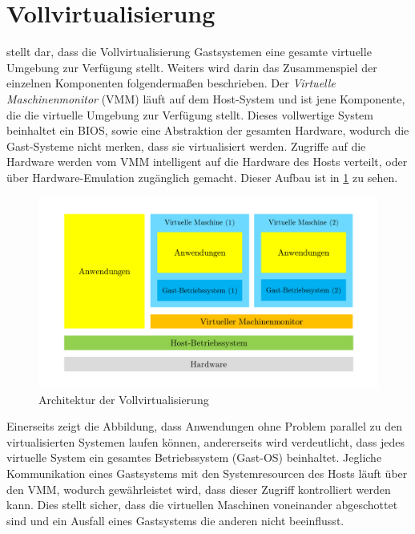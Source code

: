\section{Vollvirtualisierung}
\label{sec:vollvirtualisierung}
\autocite{Baun2009} stellt dar, dass die Vollvirtualisierung Gastsystemen eine gesamte virtuelle Umgebung zur Verfügung stellt.
Weiters wird darin das Zusammenspiel der einzelnen Komponenten folgendermaßen beschrieben.
Der \emph{Virtuelle Maschinenmonitor} (VMM) läuft auf dem Host-System und ist jene Komponente, die die virtuelle Umgebung zur Verfügung stellt.
Dieses vollwertige System beinhaltet ein BIOS, sowie eine Abstraktion der gesamten Hardware, wodurch die Gast-Systeme nicht merken, dass sie virtualisiert werden.
Zugriffe auf die Hardware werden vom VMM intelligent auf die Hardware des Hosts verteilt, oder über Hardware-Emulation zugänglich gemacht.
Dieser Aufbau ist in \cref{fig:architektur-vollvirtualisierung} zu sehen.
\begin{figure}[htbp]
    \centering
    \includegraphics[width=0.9\linewidth,clip]{images/vollvirtualisierung}
    \caption{Architektur der Vollvirtualisierung}
\label{fig:architektur-vollvirtualisierung}
\end{figure}
Einerseits zeigt die Abbildung, dass Anwendungen ohne Problem parallel zu den virtualisierten Systemen laufen können, andererseits wird verdeutlicht, dass jedes virtuelle System ein gesamtes Betriebssystem (Gast-OS) beinhaltet.
Jegliche Kommunikation eines Gastsystems mit den Systemresourcen des Hosts läuft über den VMM, wodurch gewährleistet wird, dass dieser Zugriff kontrolliert werden kann.
Dies stellt sicher, dass die virtuellen Maschinen voneinander abgeschottet sind und ein Ausfall eines Gastsystems die anderen nicht beeinflusst.

